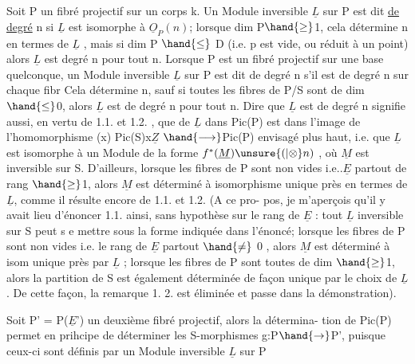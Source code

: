 Soit P un fibré projectif sur un corps k. Un Module inversible
$\underline{L}$ sur P est dit \uline{de degré} n si $\underline{L}$ est isomorphe à $\underline{O}_P(n)$; lorsque
dim P$\hand{\geq}$1, cela détermine n en termes de $\underline{L}$ , mais si dim P $\hand{\leq}$ D
(i.e. p est vide, ou réduit à un point) alors $\underline{L}$ est degré n pour tout n.
Lorsque P est un fibré projectif sur une base quelconque, un Module
inversible $\underline{L}$ sur P est dit de degré n s'il est de degré n sur chaque fibr
Cela détermine n, sauf si toutes les fibres de P/S sont de dim$\hand{\leq}$0, alors
$\underline{L}$ est de degré n pour tout n. Dire que $\underline{L}$ est de degré n signifie aussi,
en vertu de 1.1. et 1.2. , que   de $\underline{L}$ dans Pic(P) est dans
l'image de  l'homomorphisme (x) Pic(S)x$\underline{Z}$ $\hand{\longrightarrow}$Pic(P) envisagé plus haut,
i.e. que $\underline{L}$ est isomorphe à un Module de la forme $f^*(\underline{M})\unsure{(|\otimes}n)$ , où $\underline{M}$ est
inversible sur S. D'ailleurs, lorsque les fibres de P sont non vides
i.e..$\underline{E}$ partout de rang $\hand{\geq}$1, alors $\underline{M}$ est déterminé à isomorphisme unique
près en termes de $\underline{L}$, comme il résulte encore de 1.1. et 1.2. (A ce pro-%
pos, je m'aperçois qu'il y avait lieu d'énoncer 1.1. ainsi, sans hypothèse
sur le rang de $\underline{E}$ : tout $\underline{L}$ inversible sur S peut s e mettre sous la forme
indiquée dans l'énoncé; lorsque les fibres de P sont non vides i.e. le
rang de $\underline{E}$ partout $\hand{\neq}$ 0 , alors $\underline{M}$ est déterminé à isom unique près par
$\underline{L}$ ; lorsque les fibres de P sont toutes de dim $\hand{\geq}$1,  alors la partition
de S est également déterminée de façon unique par le choix de $\underline{L}$. De cette
façon, la remarque 1. 2. est éliminée et passe dans la démonstration).

Soit P' = P($\underline{E}$') un deuxième fibré projectif, alors la détermina-%
tion de Pic(P) permet en prihcipe de déterminer les S-morphismes
g:P$\hand{\to}$P', puisque ceux-ci sont définis par un Module inversible $\underline{L}$  sur P

